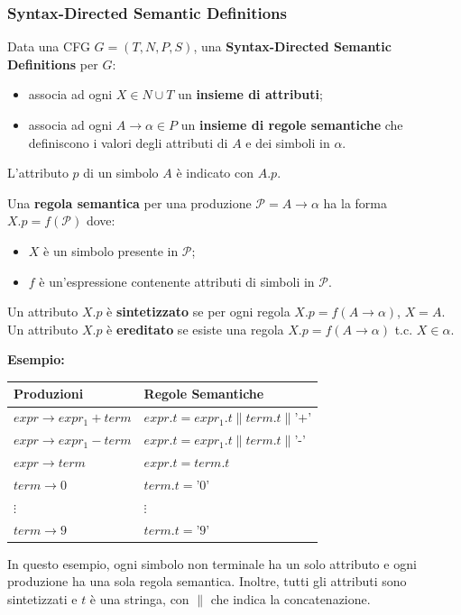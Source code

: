 \documentclass[12pt]{article}
\begin{document}
\subsubsection{Syntax-Directed Semantic Definitions}
\begin{definition}
Data una CFG $G = (T, N, P, S)$, una \textbf{Syntax-Directed Semantic Definitions} per $G$:
\begin{itemize}
    \item associa ad ogni $X \in N \cup T$ un \textbf{insieme di attributi};
    \item associa ad ogni $A \to \alpha \in P$ un \textbf{insieme di regole semantiche} che definiscono i valori degli attributi di $A$ e dei simboli in $\alpha$.
\end{itemize}
L'attributo $p$ di un simbolo $A$ è indicato con $A.p$.
\end{definition}
\begin{definition}
Una \textbf{regola semantica} per una produzione $\mathcal{P} = A \to \alpha$ ha la forma $X.p = f(\mathcal{P})$ dove:
\begin{itemize}
    \item $X$ è un simbolo presente in $\mathcal{P}$;
    \item $f$ è un'espressione contenente attributi di simboli in $\mathcal{P}$.
\end{itemize}
\end{definition}
\begin{definition}
Un attributo $X.p$ è \textbf{sintetizzato} se per ogni regola $X.p = f(A \to \alpha)$, $X = A$.\\
Un attributo $X.p$ è \textbf{ereditato} se esiste una regola $X.p = f(A \to \alpha)$ t.c. $X \in \alpha$.
\end{definition}
\noindent\textbf{Esempio:}
\begin{center}
    \renewcommand{\arraystretch}{1.2}
    \begin{tabular}{l | l}
        \textbf{Produzioni} & \textbf{Regole Semantiche} \\
        \hline
        $expr \to expr_1 + term$ & $expr.t = expr_1.t \parallel term.t \parallel \text{'+'}$ \\
        $expr \to expr_1 - term$ & $expr.t = expr_1.t \parallel term.t \parallel \text{'-'}$ \\
        $expr \to term$          & $expr.t = term.t$ \\
        $term \to 0$             & $term.t = \text{'0'}$ \\
        $\vdots$                 & $\vdots$ \\
        $term \to 9$             & $term.t = \text{'9'}$ \\
    \end{tabular}
\end{center}
In questo esempio, ogni simbolo non terminale ha un solo attributo e ogni produzione ha una sola regola semantica. Inoltre, tutti gli attributi sono sintetizzati e $t$ è una stringa, con $\parallel$ che indica la concatenazione.
\end{document}
